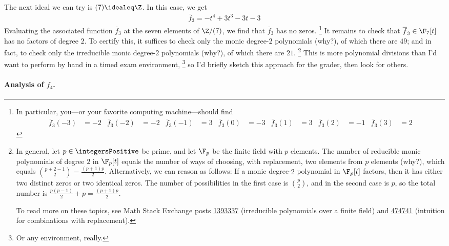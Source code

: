 {The next ideal we can try is $(7) \idealeq \Z$. In this case, we get
\begin{align*}
\overline{f}_{3}
=
-t^{4} + 3 t^{3} - 3 t - 3
\end{align*}
Evaluating the associated function $\overline{f}_{3}$ at the seven elements of $\Z / (7)$, we find that $\overline{f}_{3}$ has no zeros.%
\footnote{In particular, you---or your favorite computing machine---should find
\begin{align*}
\overline{f}_{3}(-3)
&=
-2
&
\overline{f}_{3}(-2)
&=
-2
&
\overline{f}_{3}(-1)
&=
3
&
\overline{f}_{3}(0)
&=
-3
&
\overline{f}_{3}(1)
&=
3
&
\overline{f}_{3}(2)
&=
-1
&
\overline{f}_{3}(3)
&=
2
\end{align*}} %
It remains to check that $\overline{f}_{3} \in \F_{7}[t]$ has no factors of degree $2$. To certify this, it suffices to check only the monic degree-$2$ polynomials (why?), of which there are $49$; and in fact, to check only the irreducible monic degree-$2$ polynomials (why?), of which there are $21$.%
\footnote{In general, let $p \in \integersPositive$ be prime, and let $\F_{p}$ be the finite field with $p$ elements. The number of reducible monic polynomials of degree $2$ in $\F_{p}[t]$ equals the number of ways of choosing, with replacement, two elements from $p$ elements (why?), which equals ${p + 2 - 1 \choose 2} = \frac{(p + 1) p}{2}$. Alternatively, we can reason as follows: If a monic degree-$2$ polynomial in $\F_{p}[t]$ factors, then it has either two distinct zeros or two identical zeros. The number of possibilities in the first case is ${p \choose 2}$, and in the second case is $p$, so the total number is $\frac{p (p - 1)}{2} + p = \frac{(p + 1) p}{2}$.

To read more on these topics, see Math Stack Exchange posts \href{https://math.stackexchange.com/questions/1393337/number-of-irreducible-quadratic-polynomials-over-a-finite-field}{1393337} (irreducible polynomials over a finite field) and \href{https://math.stackexchange.com/questions/474741/formula-for-combinations-with-replacement}{474741} (intuition for combinations with replacement).} %
This is more polynomial divisions than I'd want to perform by hand in a timed exam environment,%
\footnote{Or any environment, really.} %
so I'd briefly sketch this approach for the grader, then look for others.

\paragraph{Analysis of $f_{4}$.}

}
